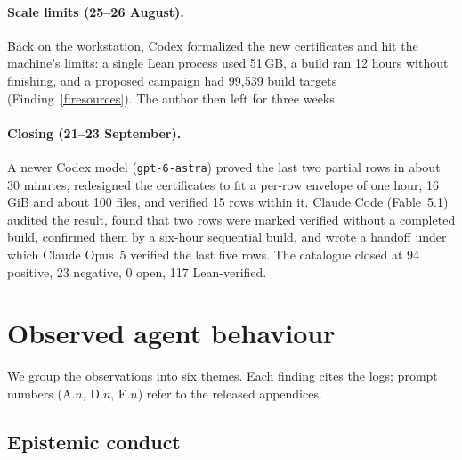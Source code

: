 \documentclass[11pt,a4paper]{article}
\newcommand{\ttt}[1]{\texttt{#1}}
\begin{document}
\paragraph{Scale limits (25--26 August).} Back on the workstation, Codex formalized the new certificates and
hit the machine's limits: a single Lean process used 51\,GB, a build ran 12 hours without finishing, and a
proposed campaign had 99,539 build targets (Finding~\ref{f:resources}). The author then left for three weeks.

\paragraph{Closing (21--23 September).} A newer Codex model (\ttt{gpt-6-astra}) proved the last two partial
rows in about 30 minutes, redesigned the certificates to fit a per-row envelope of one hour, 16\,GiB and about
100 files, and verified 15 rows within it. Claude Code (Fable~5.1) audited the result, found that two rows
were marked verified without a completed build, confirmed them by a six-hour sequential build, and wrote a
handoff under which Claude Opus~5 verified the last five rows. The catalogue closed at 94 positive, 23 negative,
0 open, 117 Lean-verified.

\section{Observed agent behaviour}\label{sec:behaviour}

We group the observations into six themes. Each finding cites the logs; prompt numbers (A.$n$, D.$n$, E.$n$)
refer to the released appendices.

\subsection{Epistemic conduct}
\end{document}

